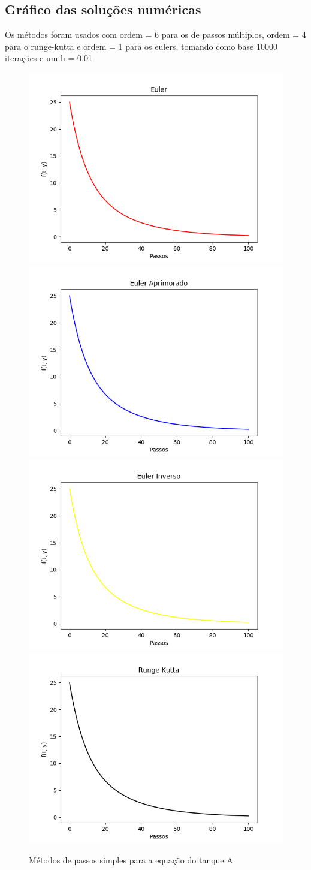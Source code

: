 \documentclass[12pt]{article}%
\begin{document}
    \subsection{Gráfico das soluções numéricas}
    Os métodos foram usados com ordem = 6 para os de passos múltiplos, ordem = 4 para o runge-kutta e ordem = 1 para os eulers, tomando como base 10000 iterações e um h = 0.01
    \begin{figure}[H]
        \begin{center}
            \includegraphics[width=.4\textwidth]{problemas/metodos_q1/tanque_a_euler.png}
            \includegraphics[width=.4\textwidth]{problemas/metodos_q1/tanque_a_euler_aprimorado.png}
            \includegraphics[width=.4\textwidth]{problemas/metodos_q1/tanque_a_euler_inverso.png}
            \includegraphics[width=.4\textwidth]{problemas/metodos_q1/tanque_a_runge_kutta.png}
        \end{center}
        \caption{Métodos de passos simples para a equação do tanque A}
    \end{figure}
\end{document}
